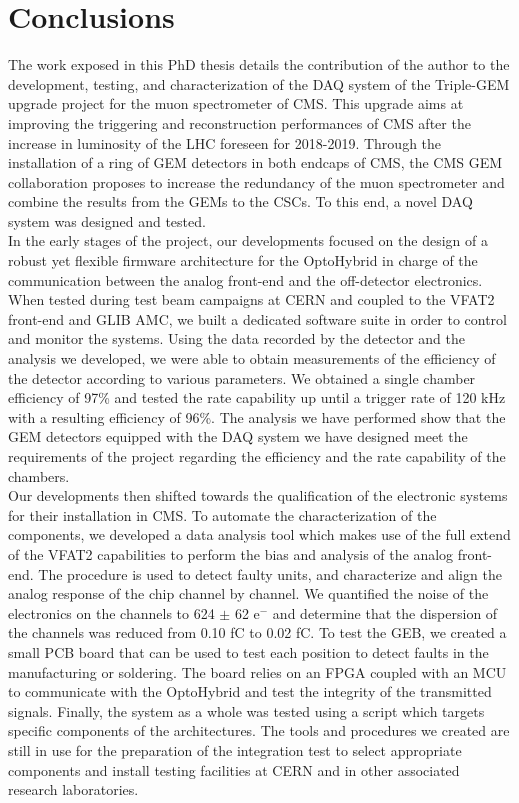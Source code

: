 \chapter*{Conclusions}
\label{chap:IV-0-conclusions}

  The work exposed in this PhD thesis details the contribution of the author to the development, testing, and characterization of the DAQ system of the Triple-GEM upgrade project for the muon spectrometer of CMS. This upgrade aims at improving the triggering and reconstruction performances of CMS after the increase in luminosity of the LHC foreseen for 2018-2019. Through the installation of a ring of GEM detectors in both endcaps of CMS, the CMS GEM collaboration proposes to increase the redundancy of the muon spectrometer and combine the results from the GEMs to the CSCs. To this end, a novel DAQ system was designed and tested. \\

  In the early stages of the project, our developments focused on the design of a robust yet flexible firmware architecture for the OptoHybrid in charge of the communication between the analog front-end and the off-detector electronics. When tested during test beam campaigns at CERN and coupled to the VFAT2 front-end and GLIB AMC, we built a dedicated software suite in order to control and monitor the systems. Using the data recorded by the detector and the analysis we developed, we were able to obtain measurements of the efficiency of the detector according to various parameters. We obtained a single chamber efficiency of 97\% and tested the rate capability up until a trigger rate of 120 kHz with a resulting efficiency of 96\%. The analysis we have performed show that the GEM detectors equipped with the DAQ system we have designed meet the requirements of the project regarding the efficiency and the rate capability of the chambers. \\

  Our developments then shifted towards the qualification of the electronic systems for their installation in CMS. To automate the characterization of the components, we developed a data analysis tool which makes use of the full extend of the VFAT2 capabilities to perform the bias and analysis of the analog front-end. The procedure is used to detect faulty units, and characterize and align the analog response of the chip channel by channel. We quantified the noise of the electronics on the channels to 624 $\pm$ 62 e$^-$ and determine that the dispersion of the channels was reduced from 0.10 fC to 0.02 fC. To test the GEB, we created a small PCB board that can be used to test each position to detect faults in the manufacturing or soldering. The board relies on an FPGA coupled with an MCU to communicate with the OptoHybrid and test the integrity of the transmitted signals. Finally, the system as a whole was tested using a script which targets specific components of the architectures. The tools and procedures we created are still in use for the preparation of the integration test to select appropriate components and install testing facilities at CERN and in other associated research laboratories. \\

